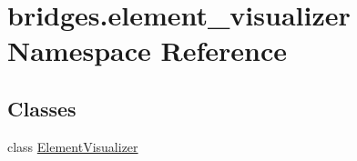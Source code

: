 \hypertarget{namespacebridges_1_1element__visualizer}{}\section{bridges.\+element\+\_\+visualizer Namespace Reference}
\label{namespacebridges_1_1element__visualizer}
\subsection*{Classes}
\begin{DoxyCompactItemize}
\item 
class \hyperlink{classbridges_1_1element__visualizer_1_1_element_visualizer}{Element\+Visualizer}
\end{DoxyCompactItemize}
